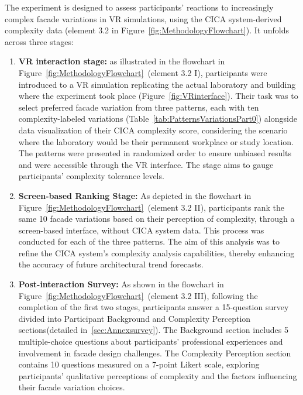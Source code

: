 %    


The experiment is designed to assess participants' reactions to increasingly complex facade variations in VR simulations, using the CICA system-derived complexity data (element 3.2 in Figure~\ref{fig:MethodologyFlowchart}). It unfolds across three stages:

\begin{enumerate}
    \item \textbf{VR interaction stage:}  as illustrated in the flowchart in Figure~\ref{fig:MethodologyFlowchart}~(element 3.2 I), participants were introduced to a VR simulation replicating the actual laboratory and building where the experiment took place (Figure~\ref{fig:VRinterface}).
    Their task was to select preferred facade variation from three patterns, each with ten complexity-labeled variations (Table~\ref{tab:PatternsVariationsPart0}) alongside data visualization of their CICA complexity score, considering the scenario where the laboratory would be their permanent workplace or study location.
    The patterns were presented in randomized order to ensure unbiased results and were accessible through the VR interface.
    The stage aims to gauge participants' complexity tolerance levels.
    \item \textbf{Screen-based Ranking Stage:} As depicted in the flowchart in Figure~\ref{fig:MethodologyFlowchart}~(element 3.2 II), participants rank the same 10 facade variations based on their perception of complexity, through a screen-based interface, without CICA system data.
    This process was conducted for each of the three patterns.
    The aim of this analysis was to refine the CICA system's complexity analysis capabilities, thereby enhancing the accuracy of future architectural trend forecasts.
    \item \textbf{Post-interaction Survey:} As shown in the flowchart in Figure~\ref{fig:MethodologyFlowchart}~(element 3.2 III), following the completion of the first two stages, participants answer a 15-question survey divided into Participant Background and Complexity Perception sections(detailed in~\ref{sec:Annexsurvey}).
    The Background section includes 5 multiple-choice questions about participants' professional experiences and involvement in facade design challenges.
    The Complexity Perception section contains 10 questions measured on a 7-point Likert scale, exploring participants' qualitative perceptions of complexity and the factors influencing their facade variation choices.
\end{enumerate}


